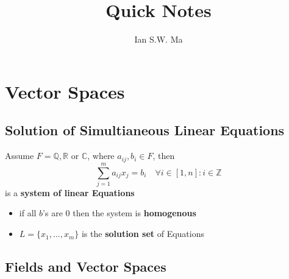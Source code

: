 \documentclass[12pt]{article}
\title{\coursename\\Quick Notes}
\author{Ian S.W. Ma}
\theoremstyle{definition}
\begin{document}
\maketitle

\setcounter{page}{1}
\section{Vector Spaces}

\subsection{Solution of Simultianeous Linear Equations}
Assume \(F = \mathbb{Q},\mathbb{R} \text{ or } \mathbb{C} \), where $a_{ij},b_i \in F$, then
\[
    \sum_{j=1}^m{a_{ij}x_j} = b_i \quad \forall i \in [1,n]:i \in \mathbb{Z}
\]
is a \textbf{system of linear Equations}

\begin{itemize}
    \item if all $b$'s are $0$ then the system is \textbf{homogenous}
    \item $L = \{x_1,...,x_m\}$ is the \textbf{solution set} of Equations
\end{itemize}

\subsection{Fields and Vector Spaces}
\end{document}
